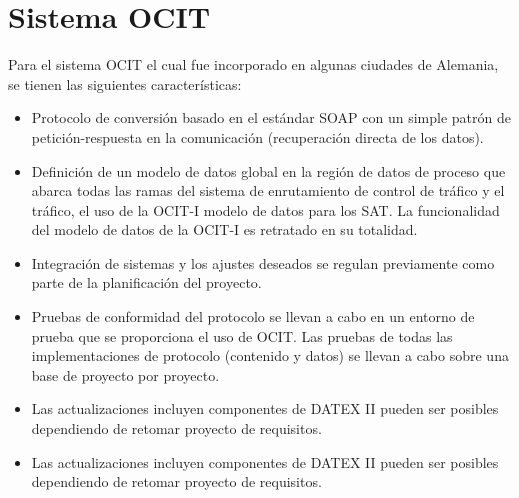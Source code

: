 \section{Sistema OCIT}
Para el sistema OCIT el cual fue incorporado en algunas ciudades de Alemania, se tienen las siguientes características:
\begin{itemize}
    \item Protocolo de conversión basado en el estándar SOAP con un simple patrón de petición-respuesta en la comunicación (recuperación directa de los datos).
    \item Definición de un modelo de datos global en la región de datos de proceso que abarca todas las ramas del sistema de enrutamiento de control de tráfico y el tráfico, el uso de la OCIT-I modelo de datos para los SAT. La funcionalidad del modelo de datos de la OCIT-I es retratado en su totalidad.
    \item Integración de sistemas y los ajustes deseados se regulan previamente como parte de la planificación del proyecto.
    \item Pruebas de conformidad del protocolo se llevan a cabo en un entorno de prueba que se proporciona el uso de OCIT. Las pruebas de todas las implementaciones de protocolo (contenido y datos) se llevan a cabo sobre una base de proyecto por proyecto.
    \item Las actualizaciones incluyen componentes de DATEX II pueden ser posibles dependiendo de retomar proyecto de requisitos.
    \item Las actualizaciones incluyen componentes de DATEX II pueden ser posibles dependiendo de retomar proyecto de requisitos.
    
\end{itemize}

